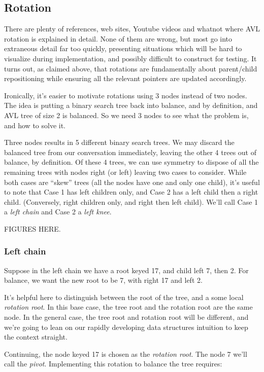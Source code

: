 \documentclass{article}
\begin{document}
\subsection{Rotation}

There are plenty of references, web sites, Youtube videos and whatnot
where AVL rotation is explained in detail. None of them are wrong, but
most go into extraneous detail far too quickly, presenting situations
which will be hard to visualize during implementation, and possibly
difficult to construct for testing. It turns out, as claimed above,
that rotations are fundamentally about parent/child repositioning
while ensuring all the relevant pointers are updated accordingly.

Ironically, it's easier to motivate rotations using 3 nodes instead
of two nodes. The idea is putting a binary search tree back into
balance, and by definition, and AVL tree of size 2 is balanced.
So we need 3 nodes to see what the problem is, and how to solve it.

Three nodes results in 5 different binary search trees. We may discard
the balanced tree from our conversation immediately, leaving the other
4 trees out of balance, by definition. Of these 4 trees, we can use
symmetry to dispose of all the remaining trees with nodes right (or left)
leaving two cases to consider. While both cases are ``skew'' trees
(all the nodes have one and only one child), it's useful to note
that Case 1 has left children only, and Case 2 has a left child then
a right child. (Conversely, right children only, and right then
left child). We'll call Case 1 a \textit{left chain} and Case 2 a
\textit{left knee}.

FIGURES HERE.

\subsubsection{Left chain}

Suppose in the left chain we have a root keyed 17, and child left
7, then 2. For balance, we want the new root to be 7, with right 17
and left 2.

It's helpful here to distinguish between the root of the tree, and a
some local \textit{rotation root}. In this base case, the tree root
and the rotation root are the same node. In the general case, the
tree root and rotation root will be different, and we're going to
lean on our rapidly developing data structures intuition to keep the
context straight.

Continuing, the node keyed 17 is chosen as the \textit{rotation root}.
The node 7 we'll call the \textit{pivot}. Implementing this rotation
to balance the tree requires:
\end{document}
